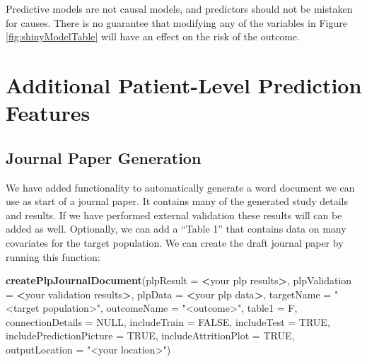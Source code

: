 \documentclass[11pt]{book}
\newenvironment{Shaded}{\begin{snugshade}}{\end{snugshade}}
\newcommand{\KeywordTok}[1]{\textcolor[rgb]{0.13,0.29,0.53}{\textbf{#1}}}
\newcommand{\DataTypeTok}[1]{\textcolor[rgb]{0.13,0.29,0.53}{#1}}
\newcommand{\StringTok}[1]{\textcolor[rgb]{0.31,0.60,0.02}{#1}}
\newcommand{\OtherTok}[1]{\textcolor[rgb]{0.56,0.35,0.01}{#1}}
\newcommand{\OperatorTok}[1]{\textcolor[rgb]{0.81,0.36,0.00}{\textbf{#1}}}
\newcommand{\NormalTok}[1]{#1}
\theoremstyle{definition}
\theoremstyle{definition}
\theoremstyle{definition}
\theoremstyle{remark}
\let\BeginKnitrBlock\begin \let\EndKnitrBlock\end
\begin{document}
\BeginKnitrBlock{rmdimportant}
Predictive models are not causal models, and predictors should not be
mistaken for causes. There is no guarantee that modifying any of the
variables in Figure \ref{fig:shinyModelTable} will have an effect on the
risk of the outcome.
\EndKnitrBlock{rmdimportant}

\section{Additional Patient-Level Prediction
Features}\label{additional-patient-level-prediction-features}

\subsection{Journal Paper Generation}\label{journal-paper-generation}

We have added functionality to automatically generate a word document we
can use as start of a journal paper. It contains many of the generated
study details and results. If we have performed external validation
these results will can be added as well. Optionally, we can add a
``Table 1'' that contains data on many covariates for the target
population. We can create the draft journal paper by running this
function:

\begin{Shaded}
\begin{Highlighting}[]
 \KeywordTok{createPlpJournalDocument}\NormalTok{(}\DataTypeTok{plpResult =} \OperatorTok{<}\NormalTok{your plp results}\OperatorTok{>}\NormalTok{,}
             \DataTypeTok{plpValidation =} \OperatorTok{<}\NormalTok{your validation results}\OperatorTok{>}\NormalTok{,}
             \DataTypeTok{plpData =} \OperatorTok{<}\NormalTok{your plp data}\OperatorTok{>}\NormalTok{,}
             \DataTypeTok{targetName =} \StringTok{"<target population>"}\NormalTok{,}
             \DataTypeTok{outcomeName =} \StringTok{"<outcome>"}\NormalTok{,}
             \DataTypeTok{table1 =}\NormalTok{ F,}
             \DataTypeTok{connectionDetails =} \OtherTok{NULL}\NormalTok{,}
             \DataTypeTok{includeTrain =} \OtherTok{FALSE}\NormalTok{,}
             \DataTypeTok{includeTest =} \OtherTok{TRUE}\NormalTok{,}
             \DataTypeTok{includePredictionPicture =} \OtherTok{TRUE}\NormalTok{,}
             \DataTypeTok{includeAttritionPlot =} \OtherTok{TRUE}\NormalTok{,}
             \DataTypeTok{outputLocation =} \StringTok{"<your location>"}\NormalTok{)}
\end{Highlighting}
\end{Shaded}
\end{document}
